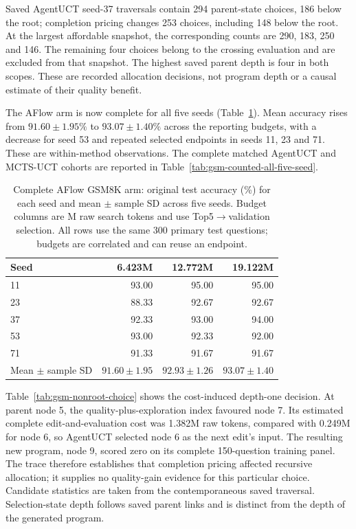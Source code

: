 Saved AgentUCT seed-37 traversals contain 294 parent-state choices,
186 below the root; completion pricing changes 253 choices, including
148 below the root. At the largest affordable snapshot, the corresponding
counts are 290, 183, 250 and 146. The remaining four choices belong to
the crossing evaluation and are excluded from that snapshot. The highest
saved parent depth is four in both scopes. These are recorded allocation
decisions, not program depth or a causal estimate of their quality benefit.

The AFlow arm is now complete for all five seeds
(Table~\ref{tab:gsm-counted-aflow-five-seed}). Mean accuracy rises from
$91.60\pm1.95\%$ to $93.07\pm1.40\%$ across the reporting budgets,
with a decrease for seed 53 and repeated selected endpoints in seeds 11,
23 and 71. These are within-method observations. The complete matched AgentUCT and MCTS-UCT cohorts are reported in
Table~\ref{tab:gsm-counted-all-five-seed}.

\begin{table}[t]
\centering\small
\caption{Complete AFlow GSM8K arm: original test accuracy (\%) for each
seed and mean $\pm$ sample SD across five seeds. Budget columns are M raw
search tokens and use Top5$\to$validation selection. All rows use the same
300 primary test questions; budgets are correlated and can reuse an endpoint.}
\label{tab:gsm-counted-aflow-five-seed}
\begin{tabular}{@{}lrrr@{}}
\toprule
Seed & 6.423M & 12.772M & 19.122M\\
\midrule
11 & 93.00 & 95.00 & 95.00\\
23 & 88.33 & 92.67 & 92.67\\
37 & 92.33 & 93.00 & 94.00\\
53 & 93.00 & 92.33 & 92.00\\
71 & 91.33 & 91.67 & 91.67\\
Mean $\pm$ sample SD & $91.60\pm1.95$ & $92.93\pm1.26$ & $93.07\pm1.40$\\
\bottomrule
\end{tabular}
\end{table}

Table~\ref{tab:gsm-nonroot-choice} shows the cost-induced depth-one decision.
At parent node 5, the quality-plus-exploration index favoured node 7.
Its estimated complete edit-and-evaluation cost was 1.382M raw tokens, compared with
0.249M for node 6, so AgentUCT selected node 6 as the next edit's input.
The resulting new program, node 9, scored zero on its complete 150-question
training panel. The trace therefore establishes that completion pricing
affected recursive allocation; it supplies no quality-gain evidence for this
particular choice. Candidate statistics are taken from the contemporaneous
saved traversal. Selection-state depth follows saved parent links and is
distinct from the depth of the generated program.

